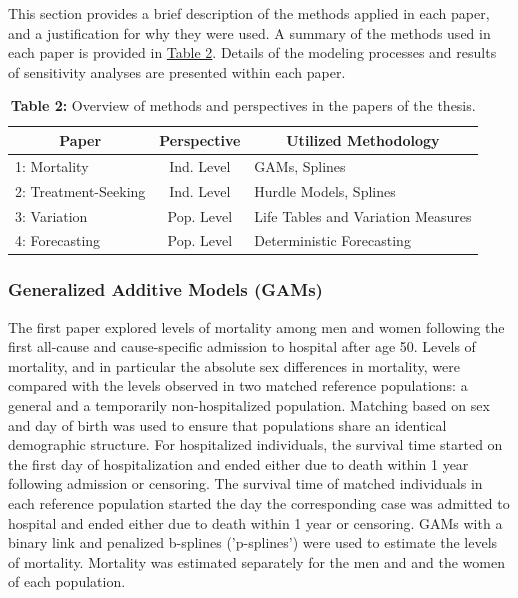 This section provides a brief description of the methods applied in each 
paper, and a justification for why they were used. A summary of the methods 
used in each paper is provided in \hyperref[ch1:tab2]{Table 2}. Details 
of the modeling processes and results of sensitivity analyses are 
presented within each paper. \\


	\begin{table}[H]
    	\centering
 		\caption*{\textbf{Table 2:}  	Overview of methods and perspectives 
 										in the papers of the thesis.}
    	\begin{tabular}{lcl}
    	\toprule
   		\multicolumn{1}{c}{\textbf{Paper}} & \textbf{Perspective} & 
   		\multicolumn{1}{c}{\textbf{Utilized Methodology}} \\
    	\midrule
    	1: Mortality  & Ind. Level & GAMs, Splines\\
    	2: Treatment-Seeking & Ind. Level & Hurdle Models, Splines\\
    	3: Variation & Pop. Level & Life Tables and Variation Measures\\
    	4: Forecasting & Pop. Level & Deterministic Forecasting\\
    	\bottomrule
    	\bottomrule
   		\end{tabular}%
 	\vspace{0.15in}
 	\label{ch1:tab2}
	\end{table}%


\subsubsection*{Generalized Additive Models (GAMs)}

The first paper explored levels of mortality among men and women 
following the first all-cause and cause-specific admission to hospital 
after age 50. Levels of mortality, and in particular the absolute sex 
differences in mortality, were compared with the levels observed in two 
matched reference populations: a general and a temporarily non-hospitalized 
population. Matching based on sex and day of birth was used to ensure 
that populations share an identical demographic structure.\citep{rothman2008modern} 
For hospitalized individuals, the survival time started on the first day 
of hospitalization and ended either due to death within 1 year following 
admission or censoring. The survival time of matched individuals in each 
reference population started the day the corresponding case was admitted 
to hospital and ended either due to death within 1 year or censoring. GAMs 
with a binary link\citep{hastie1995generalized} and penalized b-splines 
('p-splines')\citep{eilers1996flexible} were used to estimate the levels 
of mortality. Mortality was estimated separately for the men and and 
the women of each population.

